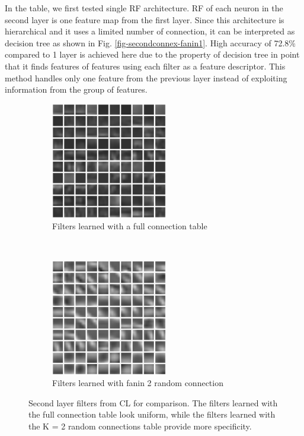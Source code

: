 \documentclass{article} %
\begin{document}
In the table, we first tested single RF architecture.
RF of each neuron in the second layer is one feature map from the first layer.
Since this architecture is hierarchical and it uses a limited number of connection, it can be interpreted as decision tree as shown in Fig. \ref{fig-secondconnex-fanin1}.
High accuracy of 72.8\% compared to 1 layer is achieved here due to the property of decision tree in point that it finds
features of features using each filter as a feature descriptor.
This method handles only one feature from the previous layer instead of exploiting information from the group of features.

\begin{figure}
        \centering
        \label{fig-secondkernels}
        \begin{subfigure}[b]{0.5\textwidth}
                \centering
                \includegraphics[width=2.0in]{fig-kernels2-full.eps}
                \caption{Filters learned with a full connection table}
                \label{fig-secondkernels-full}
        \end{subfigure}%
        ~%
        \begin{subfigure}[b]{0.5\textwidth}
                \centering
                \includegraphics[width=2.0in]{fig-kernels2-random.eps}
                \caption{Filters learned with fanin 2 random connection}
                \label{fig-secondkernels-random}
        \end{subfigure}
        \caption{Second layer filters from CL for comparison.  The filters learned with the full connection table look uniform, while the filters learned with the K = 2 random connections table provide more specificity.}
\end{figure}
\end{document}
